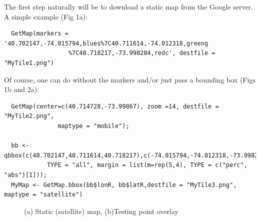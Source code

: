 \documentclass{article}
\begin{document}
\noindent The first step naturally will be to download a static map from the Google server. A simple example (Fig 1a):
\begin{verbatim}
  GetMap(markers = '40.702147,-74.015794,blues%7C40.711614,-74.012318,greeng
                  %7C40.718217,-73.998284,redc', destfile = "MyTile1.png")
\end{verbatim}
Of course, one can do without the markers and/or just pass a bounding box (Figs 1b and 2a):
\begin{verbatim}
  GetMap(center=c(40.714728,-73.99867), zoom =14, destfile = "MyTile2.png",
               maptype = "mobile");
  
  bb <- qbbox(c(40.702147,40.711614,40.718217),c(-74.015794,-74.012318,-73.998284), 
            TYPE = "all", margin = list(m=rep(5,4), TYPE = c("perc", "abs")[1]));
  MyMap <- GetMap.bbox(bb$lonR, bb$latR,destfile = "MyTile3.png", maptype = "satellite")
\end{verbatim}
\begin{figure}[ht]
    \caption{(a) Static (satellite) map, (b)Testing point overlay}
\end{figure}
\end{document}
